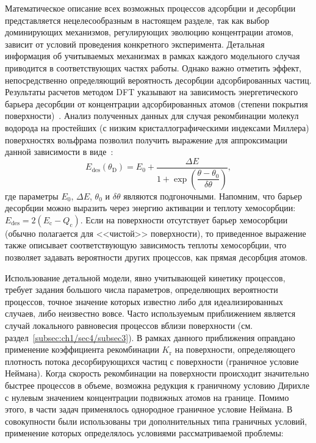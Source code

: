 Математическое описание всех возможных процессов адсорбции и десорбции представляется нецелесообразным в настоящем разделе, так как выбор доминирующих механизмов, регулирующих эволюцию концентрации атомов, зависит от условий проведения конкретного эксперимента. Детальная информация об учитываемых механизмах в рамках каждого модельного случая приводится в соответствующих частях работы. Однако важно отметить эффект, непосредственно определяющий вероятность десорбции адсорбированных частиц. Результаты расчетов методом DFT указывают на зависимость энергетического барьера десорбции от концентрации адсорбированных атомов (степени покрытия поверхности)~\cite{Piazza2018,Ajmalghan2019,Ferro2023}. Анализ полученных данных для случая рекомбинации молекул водорода на простейших (с низким кристаллографическими индексами Миллера) поверхностях вольфрама позволил получить выражение для аппроксимации данной зависимости в виде~\cite{Hodille2021}:
\begin{equation}
    \label{eq:ch2/Edes_coverage}
    E_\mathrm{des}(\theta_\mathrm{D}) = E_0 + \dfrac{\Delta E}{1+\exp\left( \dfrac{\theta-\theta_0}{\delta\theta} \right)},
\end{equation}
где параметры $E_0$, $\Delta E$, $\theta_0$ и $\delta\theta$ являются подгоночными. Напомним, что барьер десорбции можно выразить через энергию активации и теплоту хемосорбции: \( E_\mathrm{des} = 2(E_\mathrm{c}-Q_\mathrm{c}) \). Если на поверхности отсутствует барьер хемосорбции (обычно полагается для <<чистой>> поверхности), то приведенное выражение также описывает соответствующую зависимость теплоты хемосорбции, что позволяет задавать вероятности других процессов, как прямая десорбция атомов.

Использование детальной модели, явно учитывающей кинетику процессов, требует задания большого числа параметров, определяющих вероятности процессов, точное значение которых известно либо для идеализированных случаев, либо неизвестно вовсе. Часто используемым приближением является случай локального равновесия процессов вблизи поверхности (см. раздел~\cref{subsec:ch1/sec4/subsec3}). В рамках данного приближения оправдано применение коэффициента рекомбинации \( K_\mathrm{r} \) на поверхности, определяющего плотность потока десорбирующихся частиц с поверхности (граничное условие Неймана). Когда скорость рекомбинации на поверхности происходит значительно быстрее процессов в объеме, возможна редукция к граничному условию Дирихле с нулевым значением концентрации подвижных атомов на границе. Помимо этого, в части задач применялось однородное граничное условие Неймана. В совокупности были использованы три дополнительных типа граничных условий, применение которых определялось условиями рассматриваемой проблемы:

